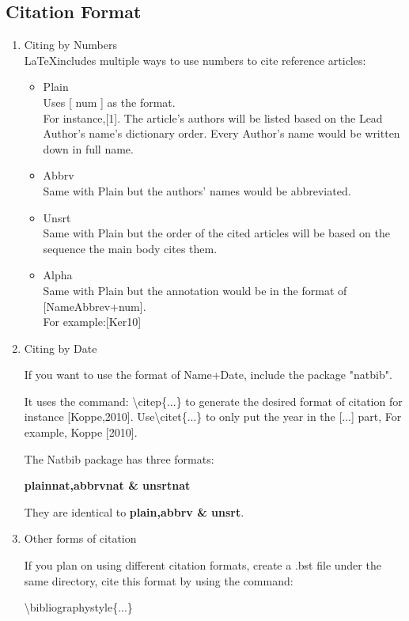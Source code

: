 \documentclass[a4paper,12pt]{article}
\begin{document}
\subsection{Citation Format}
\begin{enumerate}
    \item Citing by Numbers\\
    \LaTeX includes multiple ways to use numbers
    to cite reference articles:
    \begin{itemize}
        \item Plain\\Uses [ num ] as the format.\\
        For instance,[1].
        The article's authors will be listed based on the
        Lead Author's name's dictionary order. Every Author's name
        would be written down in full name.
        \item Abbrv\\Same with Plain but the authors' names would be abbreviated.
        \item Unsrt\\Same with Plain but the order of the cited articles
        will be based on the sequence the main body cites them.
        \item Alpha\\Same with Plain but the annotation would be in
        the format of [NameAbbrev+num].\\For example:[Ker10]
    \end{itemize}
    \item Citing by Date
    
    If you want to use the format of Name+Date, include the package "natbib".

    It uses the command: \textbackslash citep\{...\} to generate the desired format of citation
    for instance [Koppe,2010]. Use\textbackslash citet\{...\} to only put the year in the [...] part,
    For example, Koppe [2010].

    The Natbib package has three formats:
    
    \textbf{plainnat,abbrvnat \& unsrtnat}
    
    They are identical to \textbf{plain,abbrv \& unsrt}.

    \item Other forms of citation
   
    If you plan on using different citation formats, create a .bst file
    under the same directory, cite this format by using the command:

    \textbackslash bibliographystyle\{...\}

\end{enumerate}
\end{document}
